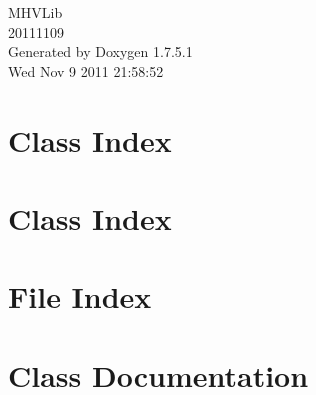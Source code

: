 \documentclass[a4paper]{book}
\begin{document}
\hypersetup{pageanchor=false,citecolor=blue}
\begin{titlepage}
\vspace*{7cm}
\begin{center}
{\Large \-M\-H\-V\-Lib \\[1ex]\large 20111109 }\\
\vspace*{1cm}
{\large \-Generated by Doxygen 1.7.5.1}\\
\vspace*{0.5cm}
{\small Wed Nov 9 2011 21:58:52}\\
\end{center}
\end{titlepage}
\clearemptydoublepage
{}
\tableofcontents
\clearemptydoublepage
{}
\hypersetup{pageanchor=true,citecolor=blue}
\chapter{\-Class \-Index}

\chapter{\-Class \-Index}

\chapter{\-File \-Index}

\chapter{\-Class \-Documentation}





































\end{document}
